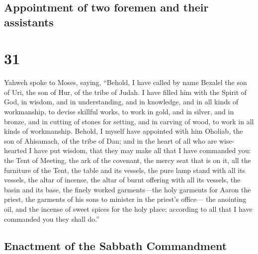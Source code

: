 \hypertarget{appointment-of-two-foremen-and-their-assistants}{%
\subsection{Appointment of two foremen and their
assistants}\label{appointment-of-two-foremen-and-their-assistants}}

\hypertarget{section-30}{%
\section{31}\label{section-30}}

 Yahweh spoke to Moses, saying,  ``Behold, I
have called by name Bezalel the son of Uri, the son of Hur, of the tribe
of Judah.  I have filled him with the Spirit of God, in
wisdom, and in understanding, and in knowledge, and in all kinds of
workmanship,  to devise skillful works, to work in gold,
and in silver, and in bronze,  and in cutting of stones
for setting, and in carving of wood, to work in all kinds of
workmanship.  Behold, I myself have appointed with him
Oholiab, the son of Ahisamach, of the tribe of Dan; and in the heart of
all who are wise-hearted I have put wisdom, that they may make all that
I have commanded you:  the Tent of Meeting, the ark of the
covenant, the mercy seat that is on it, all the furniture of the Tent,
 the table and its vessels, the pure lamp stand with all
its vessels, the altar of incense,  the altar of burnt
offering with all its vessels, the basin and its base, 
the finely worked garments---the holy garments for Aaron the priest, the
garments of his sons to minister in the priest's office---
 the anointing oil, and the incense of sweet spices for
the holy place: according to all that I have commanded you they shall
do.''

\hypertarget{enactment-of-the-sabbath-commandment}{%
\subsection{Enactment of the Sabbath
Commandment}\label{enactment-of-the-sabbath-commandment}}

